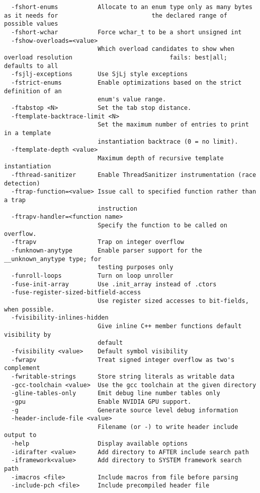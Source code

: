 \begin{verbatim}
  -fshort-enums           Allocate to an enum type only as many bytes as it needs for                          the declared range of possible values
  -fshort-wchar           Force wchar_t to be a short unsigned int
  -fshow-overloads=<value>
                          Which overload candidates to show when overload resolution                           fails: best|all; defaults to all
  -fsjlj-exceptions       Use SjLj style exceptions
  -fstrict-enums          Enable optimizations based on the strict definition of an 
                          enum's value range.
  -ftabstop <N>           Set the tab stop distance.
  -ftemplate-backtrace-limit <N>
                          Set the maximum number of entries to print in a template 
                          instantiation backtrace (0 = no limit).
  -ftemplate-depth <value>
                          Maximum depth of recursive template instantiation
  -fthread-sanitizer      Enable ThreadSanitizer instrumentation (race detection)
  -ftrap-function=<value> Issue call to specified function rather than a trap 
                          instruction
  -ftrapv-handler=<function name>
                          Specify the function to be called on overflow.
  -ftrapv                 Trap on integer overflow
  -funknown-anytype       Enable parser support for the __unknown_anytype type; for 
                          testing purposes only
  -funroll-loops          Turn on loop unroller
  -fuse-init-array        Use .init_array instead of .ctors
  -fuse-register-sized-bitfield-access
                          Use register sized accesses to bit-fields, when possible.
  -fvisibility-inlines-hidden
                          Give inline C++ member functions default visibility by 
                          default
  -fvisibility <value>    Default symbol visibility
  -fwrapv                 Treat signed integer overflow as two's complement
  -fwritable-strings      Store string literals as writable data
  -gcc-toolchain <value>  Use the gcc toolchain at the given directory
  -gline-tables-only      Emit debug line number tables only
  -gpu                    Enable NVIDIA GPU support.
  -g                      Generate source level debug information
  -header-include-file <value>
                          Filename (or -) to write header include output to
  -help                   Display available options
  -idirafter <value>      Add directory to AFTER include search path
  -iframework<value>      Add directory to SYSTEM framework search path
  -imacros <file>         Include macros from file before parsing
  -include-pch <file>     Include precompiled header file

\end{verbatim}
